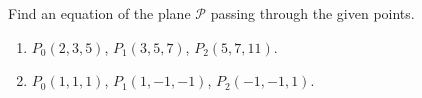 Find an equation of the plane $\mathcal P$ passing through the given points.

\begin{enumerate}
\item $P_0(2,3,5) $, $P_1(3,5,7)$, $P_2(5,7,11)$.
\item $P_0(1,1,1)$, $P_1(1,-1,-1)$, $P_2(-1,-1,1)$.
\end{enumerate}